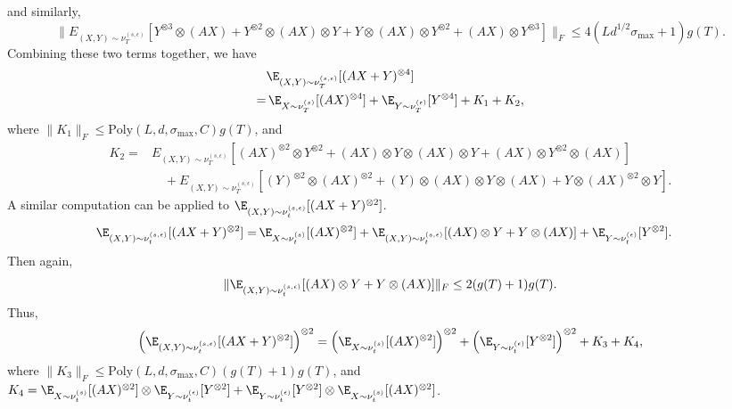 and similarly, 
\[
\| E_{(X,Y)\sim \nu_T^{(s,\epsilon)}} [Y^{\otimes 3}\otimes (AX) + Y^{\otimes 2}\otimes (AX)\otimes Y + Y\otimes (AX)\otimes Y^{\otimes 2} + (AX)\otimes Y^{\otimes 3}] \|_F \le 4(Ld^{1/2}\sigma_{\max} +1)g(T).
\]
Combining these two terms together, we have 
\begin{align*}
& \E_{(X,Y)\sim \nu_T^{(s,\epsilon)}} [(AX+Y)^{\otimes 4}]\\
 = & \,\E_{X\sim \nu_T^{(s)}}[(AX)^{\otimes 4}] + \E_{Y\sim \nu_T^{(\epsilon)}}[Y^{\otimes 4}] + K_1 +K_2,
\end{align*}
where $\|K_1\|_F \le\text{Poly}(L, d, \sigma_{\max}, C)g(T) $, and 
\begin{align*}
K_2  = & E_{(X,Y)\sim \nu_T^{(s,\epsilon)}} [ (AX)^{\otimes 2}\otimes Y^{\otimes 2} + (AX)\otimes Y\otimes (AX)\otimes Y + (AX)\otimes Y^{\otimes 2}\otimes (AX)]\\
& \quad+  E_{(X,Y)\sim \nu_T^{(s,\epsilon)}} [ (Y)^{\otimes 2}\otimes (AX)^{\otimes 2} + (Y)\otimes (AX)\otimes Y\otimes (AX) + Y\otimes (AX)^{\otimes 2}\otimes Y]. 
\end{align*}
A similar computation can be applied to $\E_{(X,Y)\sim \nu_t^{(s,\epsilon)}} [(AX+Y)^{\otimes 2}]$.
\begin{align*}
\E_{(X,Y)\sim \nu_t^{(s,\epsilon)}} [(AX+Y)^{\otimes 2}]= & \, \E_{X\sim \nu_t^{(s)}}[(AX)^{\otimes 2}] + \E_{(X,Y)\sim \nu_t^{(s,\epsilon)}}[(AX)\otimes Y + Y\otimes (AX)] + \E_{Y\sim \nu_t^{(\epsilon)}}[Y^{\otimes 2}].
\end{align*}
Then again,
\[
\|\E_{(X,Y)\sim \nu_t^{(s,\epsilon)}}[(AX)\otimes Y + Y\otimes (AX)]\|_F \le 2(g(T)+1)g(T).
\]
Thus, 
\[
\left( \E_{(X,Y)\sim \nu_t^{(s,\epsilon)}} [(AX+Y)^{\otimes 2}]\right)^{\otimes2} =  \left(\E_{X\sim \nu_t^{(s)}}[(AX)^{\otimes 2}]\right)^{\otimes2} + \left( \E_{Y\sim \nu_t^{(\epsilon)}}[Y^{\otimes 2}]\right)^{\otimes 2} + K_3+K_4,
\]
where $\|K_3\|_F \le \text{Poly}(L, d, \sigma_{\max}, C)(g(T)+1)g(T) $, and $K_4 = \E_{X\sim \nu_t^{(s)}}[(AX)^{\otimes 2}] \otimes \E_{Y\sim \nu_t^{(\epsilon)}}[Y^{\otimes 2}] + \E_{Y\sim \nu_t^{(\epsilon)}}[Y^{\otimes 2}] \otimes \E_{X\sim \nu_t^{(s)}}[(AX)^{\otimes 2}]$.

